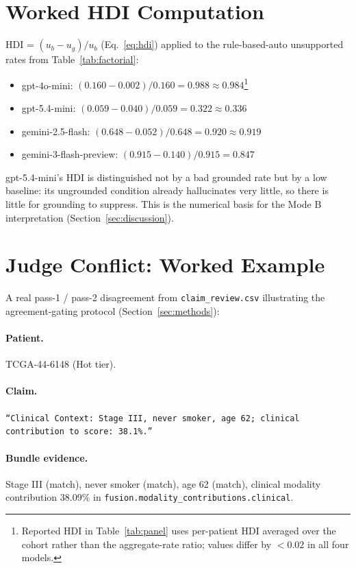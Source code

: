 \documentclass{article}
\theoremstyle{plain}
\begin{document}
\section{Worked HDI Computation}
\label{app:hdi-math}

HDI = $(u_b - u_g)/u_b$ (Eq.~\ref{eq:hdi}) applied to the rule-based-auto unsupported rates from Table~\ref{tab:factorial}:

\begin{itemize}
\item gpt-4o-mini: $(0.160 - 0.002)/0.160 = 0.988 \approx 0.984$\footnote{Reported HDI in Table~\ref{tab:panel} uses per-patient HDI averaged over the cohort rather than the aggregate-rate ratio; values differ by $<0.02$ in all four models.}
\item gpt-5.4-mini: $(0.059 - 0.040)/0.059 = 0.322 \approx 0.336$
\item gemini-2.5-flash: $(0.648 - 0.052)/0.648 = 0.920 \approx 0.919$
\item gemini-3-flash-preview: $(0.915 - 0.140)/0.915 = 0.847$
\end{itemize}

gpt-5.4-mini's HDI is distinguished not by a bad grounded rate but by a low baseline: its ungrounded condition already hallucinates very little, so there is little for grounding to suppress. This is the numerical basis for the Mode B interpretation (Section~\ref{sec:discussion}).

\section{Judge Conflict: Worked Example}
\label{app:conflict}

A real pass-1 / pass-2 disagreement from \texttt{claim\_review.csv} illustrating the agreement-gating protocol (Section~\ref{sec:methods}):

\paragraph{Patient.} TCGA-44-6148 (Hot tier).

\paragraph{Claim.} \texttt{``Clinical Context: Stage III, never smoker, age 62; clinical contribution to score: 38.1\%.''}

\paragraph{Bundle evidence.} Stage III (match), never smoker (match), age 62 (match), clinical modality contribution 38.09\% in \texttt{fusion.modality\_contributions.clinical}.
\end{document}
